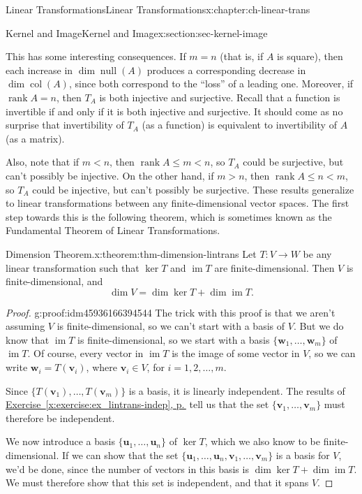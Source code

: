 \documentclass[oneside,10pt,]{book}
\newcommand{\xreffont}{\relax}
\numberwithin{equation}{section}
\newcommand{\im}{\operatorname{im}}
\newcommand{\nll}{\operatorname{null}}
\newcommand{\csp}{\operatorname{col}}
\newcommand{\rank}{\operatorname{rank}}
\newcommand{\uu}{\mathbf{u}}
\newcommand{\vv}{\mathbf{v}}
\newcommand{\ww}{\mathbf{w}}
\newcommand{\lt}{<}
\newcommand{\gt}{>}
\begin{document}
\begin{chapterptx}{Linear Transformations}{}{Linear Transformations}{}{}{x:chapter:ch-linear-trans}
\begin{sectionptx}{Kernel and Image}{}{Kernel and Image}{}{}{x:section:sec-kernel-image}
\par
This has some interesting consequences. If \(m=n\) (that is, if \(A\) is square), then each increase in \(\dim \nll(A)\) produces a corresponding decrease in \(\dim \csp(A)\), since both correspond to the ``loss'' of a leading one. Moreover, if \(\rank A = n\), then \(T_A\) is both injective and surjective. Recall that a function is invertible if and only if it is both injective and surjective. It should come as no surprise that invertibility of \(T_A\) (as a function) is equivalent to invertibility of \(A\) (as a matrix).%
\par
Also, note that if \(m \lt n\), then \(\rank A\leq m \lt n\), so \(T_A\) could be surjective, but can't possibly be injective. On the other hand, if \(m\gt n\), then \(\rank A\leq n \lt m\), so \(T_A\) could be injective, but can't possibly be surjective. These results generalize to linear transformations between any finite-dimensional vector spaces. The first step towards this is the following theorem, which is sometimes known as the Fundamental Theorem of Linear Transformations.%
\begin{theorem}{Dimension Theorem.}{}{x:theorem:thm-dimension-lintrans}%
Let \(T:V\to W\) be any linear transformation such that \(\ker T\) and \(\im T\) are finite-dimensional. Then \(V\) is finite-dimensional, and%
\begin{equation*}
\dim V = \dim \ker T + \dim \im T\text{.}
\end{equation*}
%
\end{theorem}
\begin{proof}{}{g:proof:idm45936166394544}
The trick with this proof is that we aren't assuming \(V\) is finite-dimensional, so we can't start with a basis of \(V\). But we do know that \(\im T\) is finite-dimensional, so we start with a basis \(\{\ww_1,\ldots, \ww_m\}\) of \(\im T\). Of course, every vector in \(\im T\) is the image of some vector in \(V\), so we can write \(\ww_i =T(\vv_i)\), where \(\vv_i\in V\), for \(i=1,2,\ldots, m\).%
\par
Since \(\{T(\vv_1),\ldots, T(\vv_m)\}\) is a basis, it is linearly independent. The results of \hyperref[x:exercise:ex_lintrans-indep]{Exercise~{\xreffont\ref{x:exercise:ex_lintrans-indep}}, p.\,\pageref{x:exercise:ex_lintrans-indep}} tell us that the set \(\{\vv_1,\ldots, \vv_m\}\) must therefore be independent.%
\par
We now introduce a basis \(\{\uu_1,\ldots, \uu_n\}\) of \(\ker T\), which we also know to be finite-dimensional. If we can show that the set \(\{\uu_1,\ldots, \uu_n,\vv_1,\ldots, \vv_m\}\) is a basis for \(V\), we'd be done, since the number of vectors in this basis is \(\dim\ker T + \dim \im T\). We must therefore show that this set is independent, and that it spans \(V\).%

\end{proof}
\end{sectionptx}
\end{chapterptx}
\end{document}
